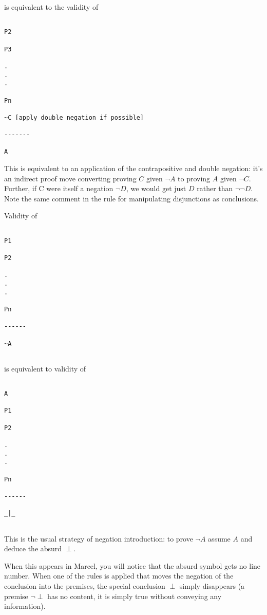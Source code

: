 \documentclass[12pt]{article}
\begin{document}
is equivalent to the validity of
{\small 
\begin{verbatim}

P2

P3

.
.
.

Pn

~C [apply double negation if possible]

-------

A

\end{verbatim}}

This is equivalent to an application of the contrapositive and double negation:  it's an indirect
proof move converting proving $C$ given $\neg A$ to proving $A$ given $\neg C$.  Further, if C were itself
a negation $\neg D$, we would get just $D$ rather than $\neg \neg D$.  Note the same comment in
the rule for manipulating disjunctions as conclusions.

\newpage

Validity of 

\begin{verbatim}

P1

P2

.
.
.

Pn

------

~A


\end{verbatim}

is equivalent to validity of 

\begin{verbatim}

A

P1

P2

.
.
.

Pn

------

_|_


\end{verbatim}

This is the usual strategy of negation introduction:  to prove $\neg A$ assume $A$ and deduce the absurd $\perp$.

When this appears in Marcel, you will notice that the absurd symbol gets no line number.  When one of the rules
is applied that moves the negation of the conclusion into the premises, the special conclusion $\perp$ simply disappears
(a premise $\neg \perp$ has no content, it is simply true without conveying any information).
\end{document}
